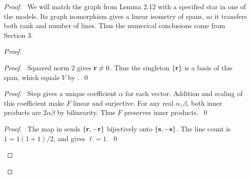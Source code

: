 \begin{proof}
 \pfsketch\ We will match the graph from Lemma 2.12 with a specified star in one of the
 models. Its graph isomorphism gives a linear isometry of spans, so it transfers both
 rank and number of lines. Thus the numerical conclusions come from Section 3.

 \begin{proof}
  \begin{proof}
   \pf\ Squared norm 2 gives ${\mathbf r}\ne0$. Thus the singleton $\{{\mathbf r}\}$ is a basis
   of this span, which equals $V$ by .~\qed
  \end{proof}
  \begin{proof}
   \pf\ Step  gives a unique coefficient $\alpha$ for each vector.
   Addition and scaling of this coefficient make $F$ linear and surjective.
   For any real $\alpha,\beta$, both inner products are $2\alpha\beta$ by bilinearity.
   Thus $F$ preserves inner products.~\qed
  \end{proof}
  \qedstep
  \begin{proof}
   \pf\ The map in  sends $\{{\mathbf r},-{\mathbf r}\}$ bijectively onto
   $\{{\mathbf s},-{\mathbf s}\}$. The line count is $1=1(1+1)/2$, and
    gives $\ell=1$.~\qed
  \end{proof}
 \end{proof}


\end{proof}
